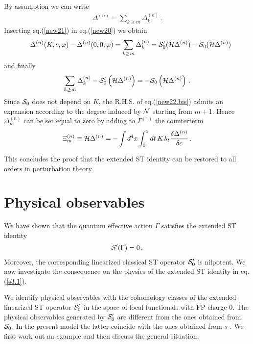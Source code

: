 \documentclass[a4paper,11pt]{article}
\def\G{\Gamma}
\begin{document}
By assumption we can write
%
\begin{eqnarray}
\Delta^{(n)}= \sum_{k \geq m} \Delta^{(n)}_k \, .
\label{new21}
\end{eqnarray}
%
Inserting eq.(\ref{new21}) in eq.(\ref{new20}) we obtain
%
\begin{eqnarray}
&& \Delta^{(n)}(K,c,\varphi)
- \Delta^{(n)}(0,0,\varphi) = \sum_{k \geq m} \Delta^{(n)}_k 
= {\cal S}'_0( 
{\cal H} \Delta^{(n)} )
- {\cal S}_0( 
{\cal H} \Delta^{(n)} 
) 
\label{new22}
\end{eqnarray}
%
and finally
%
\begin{eqnarray}
\sum_{k \geq m} \Delta^{(n)}_k - {\cal S}'_0\left( 
{\cal H} \Delta^{(n)}
\right)
=  -{\cal S}_0\left(
{\cal H} \Delta^{(n)}
\right) \, .
\label{new22.bis}
\end{eqnarray}
%
Since ${\cal S}_0$ does not depend on $K$, the R.H.S. of eq.(\ref{new22.bis})
 admits
an expansion according to the degree induced by ${\cal N}$ starting from 
$m+1$.
Hence $\Delta^{(n)}_m$ can be set equal to zero by adding to $\G^{(1)}$ 
the counterterm
%
\begin{eqnarray}
\Xi^{(n)}_m \equiv {\cal H} \Delta^{(n)} = 
- \int d^4x \int_0^1 dt \, K \lambda_t {\delta \Delta^{(n)} \over \delta c} \, .
\label{new23}
\end{eqnarray}
%

This concludes the proof that the extended ST identity can be restored to all orders
in perturbation theory.


\section{Physical observables} \label{sez3}

We have shown that the quantum effective action $\G$ satisfies the
extended ST identity
%
\begin{eqnarray}
{\cal S}'(\G)=0 \, .
\label{s3.1}
\end{eqnarray}
%
Moreover, the corresponding linearized classical ST operator
${\cal S}'_0$ is nilpotent. 
We now investigate the consequence
on the physics of the extended ST identity in eq.(\ref{s3.1}).

We identify physical observables with the cohomology classes
of the extended linearized ST operator ${\cal S}_0'$ in the
space of local functionals with FP charge $0$.
The physical observables generated by ${\cal S}_0'$ are
different from the ones obtained from ${\cal S}_0$.
In the present model the latter coincide with the ones obtained from $s$
\cite{anomalies}.
We first work out an example and then discuss the general
situation.
\end{document}
